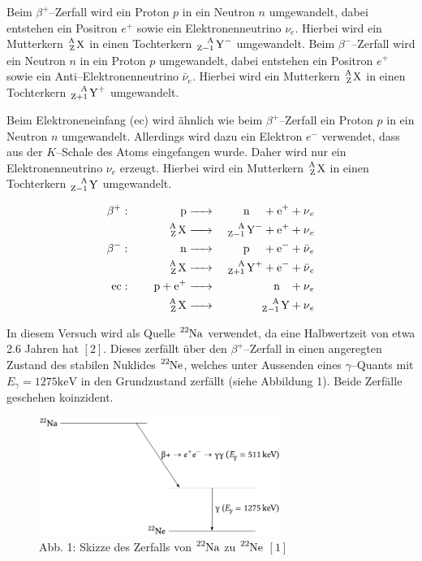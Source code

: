 \documentclass[12pt,a4paper]{scrartcl}
\numberwithin{equation}{section} %
\newcommand{\pu}[1]{\ensuremath{\mathrm{#1}}}
\renewcommand{\[}{} %
\renewcommand{\]}{\noindent} %
\begin{document}
Beim \(\beta^+\)--Zerfall wird ein Proton \(p\) in ein Neutron \(n\)
umgewandelt, dabei entstehen ein Positron \(e^+\) sowie ein
Elektronenneutrino \(\nu_e\). Hierbei wird ein Mutterkern
\(\ce{^A_Z X}\) in einen Tochterkern \(\ce{^A_{Z-1} Y^-}\) umgewandelt.
Beim \(\beta^-\)--Zerfall wird ein Neutron \(n\) in ein Proton \(p\)
umgewandelt, dabei entstehen ein Positron \(e^+\) sowie ein
Anti--Elektronenneutrino \(\bar{\nu}_e\). Hierbei wird ein Mutterkern
\(\ce{^A_Z X}\) in einen Tochterkern \(\ce{^A_{Z+1} Y^+}\) umgewandelt.

Beim Elektroneneinfang (ec) wird ähnlich wie beim \(\beta^+\)--Zerfall
ein Proton \(p\) in ein Neutron \(n\) umgewandelt. Allerdings wird dazu
ein Elektron \(e^-\) verwendet, dass aus der \(K\)--Schale des Atoms
eingefangen wurde. Daher wird nur ein Elektronenneutrino \(\nu_e\)
erzeugt. Hierbei wird ein Mutterkern \(\ce{^A_Z X}\) in einen
Tochterkern \(\ce{^A_{Z-1} Y}\) umgewandelt.

\[
\begin{eqnarray}
    \beta^+:\qquad\,\,\qquad
        \ce{p} &\ce{->}& \quad \ce{n} \quad\, + \ce{e^+} + \ce{\nu_e} \\
        \ce{^A_Z X} &\ce{->}& \ce{^A_{Z-1} Y^-} + \ce{e^+} + \ce{\nu_e} \\
    \beta^-:\qquad\,\,\qquad
        \ce{n} &\ce{->}& \quad \ce{p} \quad\, + \ce{e^-} + \ce{\bar{\nu}_e} \\
        \ce{^A_Z X} &\ce{->}& \ce{^A_{Z+1} Y^+} + \ce{e^-} + \ce{\bar{\nu}_e} \\
    \text{ec}:\qquad
        \ce{p + e^+} &\ce{->}& \quad \ce{n} \ \ \, + \ce{\nu_e} \\
        \ce{^A_Z X} &\ce{->}& \ce{^A_{Z-1} Y} + \ce{\nu_e}
\end{eqnarray}
\]

In diesem Versuch wird als Quelle \(\ce{^{22}Na}\) verwendet, da eine
Halbwertzeit von etwa 2.6 Jahren hat \([2]\). Dieses zerfällt über den
\(\beta^+\)--Zerfall in einen angeregten Zustand des stabilen Nuklides
\(\ce{^{22}Ne}\), welches unter Aussenden eines \(\gamma\)--Quants mit
\(E_\gamma = \pu{1275 keV}\) in den Grundzustand zerfällt (siehe
Abbildung 1). Beide Zerfälle geschehen koinzident.

\begin{figure}
	\centering
	\includegraphics[width=0.7\textwidth]{../media/B3.4/Zerfall_22_Na.pdf}
	\caption{Abb. 1: Skizze des Zerfalls von \(\ce{^{22}Na}\) zu \(\ce{^{22}Ne}\) \([1]\)}
	\label{abb:Skizze 22Na}
\end{figure}
\end{document}
